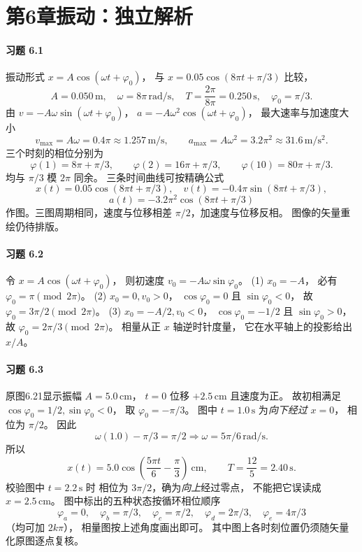 \section*{第6章\quad 振动：独立解析}

\paragraph{习题 6.1}
振动形式 \(x=A\cos(\omega t+\varphi_0)\)，
与 \(x=0.05\cos(8\pi t+\pi/3)\) 比较，
\[
 \boxed{A=0.050\,\mathrm m,\quad
 \omega=8\pi\,\mathrm{rad/s},\quad
 T=\frac{2\pi}{8\pi}=0.250\,\mathrm s,\quad
 \varphi_0=\pi/3}.
\]
由
\(v=-A\omega\sin(\omega t+\varphi_0)\)，
\(a=-A\omega^2\cos(\omega t+\varphi_0)\)，
最大速率与加速度大小
\[
 \boxed{v_{\max}=A\omega=0.4\pi
 \approx1.257\,\mathrm{m/s}},\qquad
 \boxed{a_{\max}=A\omega^2
 =3.2\pi^2\approx31.6\,\mathrm{m/s^2}}.
\]
三个时刻的相位分别为
\[
 \varphi(1)=8\pi+\pi/3,\qquad
 \varphi(2)=16\pi+\pi/3,\qquad
 \varphi(10)=80\pi+\pi/3.
\]
均与 \(\pi/3\) 模 \(2\pi\) 同余。
三条时间曲线可按精确公式
\[
 \boxed{x(t)=0.05\cos(8\pi t+\pi/3)},\quad
 \boxed{v(t)=-0.4\pi\sin(8\pi t+\pi/3)},
\]
\[
 \boxed{a(t)=-3.2\pi^2\cos(8\pi t+\pi/3)}
\]
作图。三图周期相同，速度与位移相差
\(\pi/2\)，加速度与位移反相。
图像的矢量重绘仍待排版。

\paragraph{习题 6.2}
令 \(x=A\cos(\omega t+\varphi_0)\)，
则初速度
\(v_0=-A\omega\sin\varphi_0\)。
(1) \(x_0=-A\)，
必有
\(\boxed{\varphi_0=\pi\pmod{2\pi}}\)。
(2) \(x_0=0,v_0>0\)，
\(\cos\varphi_0=0\) 且
\(\sin\varphi_0<0\)，
故
\(\boxed{\varphi_0=3\pi/2\pmod{2\pi}}\)。
(3) \(x_0=-A/2,v_0<0\)，
\(\cos\varphi_0=-1/2\) 且
\(\sin\varphi_0>0\)，
故
\(\boxed{\varphi_0=2\pi/3\pmod{2\pi}}\)。
相量从正 \(x\) 轴逆时针度量，
它在水平轴上的投影给出 \(x/A\)。

\paragraph{习题 6.3}
原图6.21显示振幅
\(A=5.0\,\mathrm{cm}\)，
\(t=0\) 位移 \(+2.5\,\mathrm{cm}\)
且速度为正。
故初相满足
\(\cos\varphi_0=1/2,\sin\varphi_0<0\)，
取 \(\varphi_0=-\pi/3\)。
图中 \(t=1.0\,\mathrm s\)
为\emph{向下经过} \(x=0\)，
相位为 \(\pi/2\)。
因此
\[
 \omega(1.0)-\pi/3=\pi/2
 \Longrightarrow
 \boxed{\omega=5\pi/6\,\mathrm{rad/s}}.
\]
所以
\[
 \boxed{x(t)=5.0\cos\left(\frac{5\pi t}{6}
 -\frac\pi3\right)\ \mathrm{cm}},\qquad
 \boxed{T=\frac{12}{5}=2.40\,\mathrm s}.
\]
校验图中 \(t=2.2\,\mathrm s\) 时
相位为 \(3\pi/2\)，确为\emph{向上}经过零点，
不能把它误读成 \(x=2.5\,\mathrm{cm}\)。
图中标出的五种状态按循环相位顺序
\[
 \boxed{\varphi_a=0,\quad
 \varphi_b=\pi/3,\quad
 \varphi_c=\pi/2,\quad
 \varphi_d=2\pi/3,\quad
 \varphi_e=4\pi/3}
\]
（均可加 \(2k\pi\)），
相量图按上述角度画出即可。
其中图上各时刻位置仍须随矢量化原图逐点复核。

